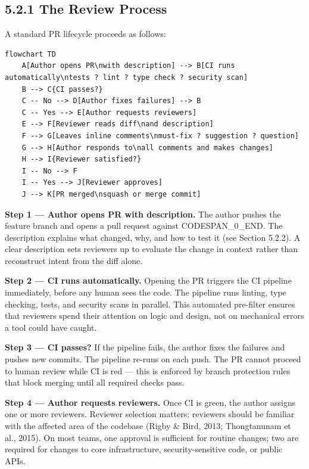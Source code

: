 \documentclass[11pt,a4paper]{book}
\begin{document}
\subsection{5.2.1 The Review Process}

A standard PR lifecycle proceeds as follows:

\begin{lstlisting}
flowchart TD
    A[Author opens PR\nwith description] --> B[CI runs automatically\ntests ? lint ? type check ? security scan]
    B --> C{CI passes?}
    C -- No --> D[Author fixes failures] --> B
    C -- Yes --> E[Author requests reviewers]
    E --> F[Reviewer reads diff\nand description]
    F --> G[Leaves inline comments\nmust-fix ? suggestion ? question]
    G --> H[Author responds to\nall comments and makes changes]
    H --> I{Reviewer satisfied?}
    I -- No --> F
    I -- Yes --> J[Reviewer approves]
    J --> K[PR merged\nsquash or merge commit]
\end{lstlisting}

\textbf{Step 1 --- Author opens PR with description.} The author pushes the feature branch and opens a pull request against CODESPAN\_0\_END. The description explains what changed, why, and how to test it (see Section 5.2.2). A clear description sets reviewers up to evaluate the change in context rather than reconstruct intent from the diff alone.

\textbf{Step 2 --- CI runs automatically.} Opening the PR triggers the CI pipeline immediately, before any human sees the code. The pipeline runs linting, type checking, tests, and security scans in parallel. This automated pre-filter ensures that reviewers spend their attention on logic and design, not on mechanical errors a tool could have caught.

\textbf{Step 3 --- CI passes?} If the pipeline fails, the author fixes the failures and pushes new commits. The pipeline re-runs on each push. The PR cannot proceed to human review while CI is red --- this is enforced by branch protection rules that block merging until all required checks pass.

\textbf{Step 4 --- Author requests reviewers.} Once CI is green, the author assigns one or more reviewers. Reviewer selection matters: reviewers should be familiar with the affected area of the codebase (Rigby \& Bird, 2013; Thongtanunam et al., 2015). On most teams, one approval is sufficient for routine changes; two are required for changes to core infrastructure, security-sensitive code, or public APIs.
\end{document}
